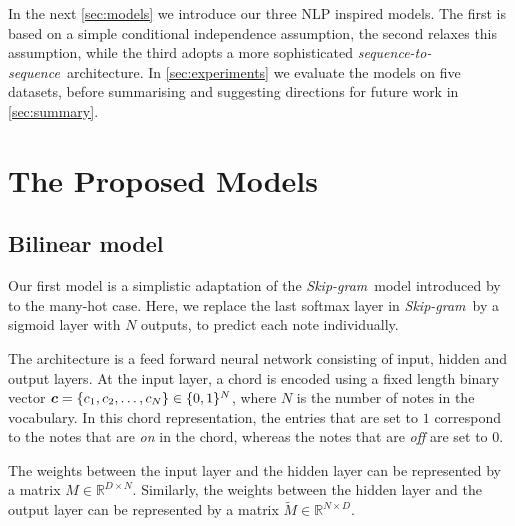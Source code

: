 \documentclass{article}
\newcommand{\R}{\mathbb{R}}
\newcommand{\M}{\tilde{M}}
\newcommand{\boldc}{\boldsymbol c}
\newcommand{\skipgram}{\textit{Skip-gram}}
\newcommand{\seqtoseq}{\textit{sequence-to-sequence}}
\begin{document}
In the next \autoref{sec:models} we introduce our three NLP inspired models. The first is based on a simple conditional independence assumption, the second relaxes this assumption, while the third adopts a more sophisticated \seqtoseq\ architecture. In \autoref{sec:experiments} we evaluate the models on five datasets, before summarising and suggesting directions for future work in \autoref{sec:summary}. 

\section{The Proposed Models}
\label{sec:models}
\subsection{Bilinear model}
Our first model is a simplistic adaptation of the \skipgram\ model introduced by \citet{mik2013} to the many-hot case. Here, we replace the last softmax layer in \skipgram\ by a sigmoid layer with $N$ outputs, to predict each note individually.  

The architecture is a feed forward neural network consisting of input, hidden and output layers. At the input layer, a chord is encoded using a fixed length binary vector $\nolinebreak{\boldc = \{c_1, c_2, \ldots, c_N\}\in \{0,1\}^N}$, where $N$ is the number of notes in the vocabulary. In this chord representation, the entries that are set to $1$ correspond to the notes that are \textit{on} in the chord, whereas the notes that are \textit{off} are set to $0$. 

The weights between the input layer and the hidden layer can be represented by a matrix $M\in \R^{D \times N}$. Similarly, the weights between the hidden layer and the output layer can be represented by a matrix $\M\in \R^{N \times D}$. 
\end{document}

